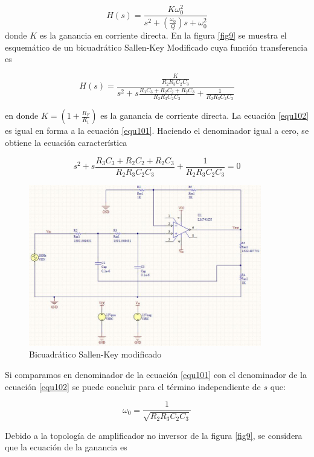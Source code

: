 \documentclass[12pt]{book}
\theoremstyle{definition}
\theoremstyle{remark}
\theoremstyle{plain}
\begin{document}
\begin{equation}
H(s)=\frac{K \omega_0^2}{s^2+(\frac{\omega _0}{Q}) s+\omega_0^2}
\label{equ101}
\end{equation}
donde $K$ es la ganancia en corriente directa. En la figura \ref{fig9} se muestra el esquemático de un bicuadrático Sallen-Key Modificado cuya función transferencia es

\begin{equation}
H(s)=\frac{\frac{K}{R_2 R_3 C_2 C_3}}{s^2+ s \frac{R_3 C_3+R_2 C_2+R_2 C_3}{R_2 R_3 C_2 C_3}+\frac{1}{R_2 R_3 C_2 C_3}}
\label{equ102}
\end{equation}

en donde $K=(1+ \frac{R_F}{R_1})$ es la ganancia de corriente directa. La ecuación \ref{equ102} es igual en forma a la ecuación \ref{equ101}. Haciendo el denominador igual a cero, se obtiene la ecuación característica

\begin{equation}
s^2+ s \frac{R_3 C_3+R_2 C_2+R_2 C_3}{R_2 R_3 C_2 C_3}+\frac{1}{R_2 R_3 C_2 C_3}=0
\label{equ103}
\end{equation}

\begin{figure}
\centering
\includegraphics[width=4in]{BicuadraticoPasabajas.jpg}
\caption{Bicuadrático Sallen-Key modificado}
\label{fig10}
\end{figure}

Si comparamos en denominador de la ecuación \ref{equ101} con el denominador de la ecuación \ref{equ102} se puede concluir para el término independiente de $s$ que:

\begin{equation}
\omega _0 = \frac{1}{\sqrt{R_2 R_3 C_2 C_3}}
\label{equ104}
\end{equation}

Debido a la topología de amplificador no inversor de la figura \ref{fig9}, se considera que la ecuación de la ganancia es
\end{document}
